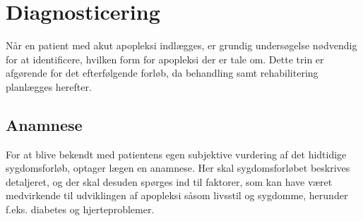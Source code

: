 
\section{Diagnosticering}

Når en patient med akut apopleksi indlægges, er grundig undersøgelse nødvendig for at identificere, hvilken form for apopleksi der er tale om. Dette trin er afgørende for det efterfølgende forløb, da behandling samt rehabilitering planlægges herefter. \citep{Sundhedsstyrelsen2009}

\subsection{Anamnese}
For at blive bekendt med patientens egen subjektive vurdering af det hidtidige sygdomsforløb, optager lægen en anamnese. Her skal sygdomsforløbet  beskrives detaljeret, og der skal desuden spørges ind til faktorer, som kan have været medvirkende til udviklingen af apopleksi såsom livsstil og sygdomme, herunder f.eks. diabetes og hjerteproblemer. \citep{Sundhedsstyrelsen2009}

